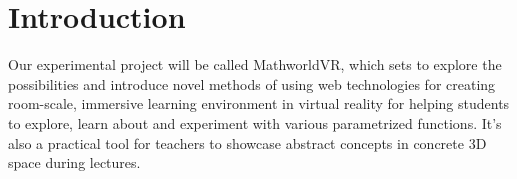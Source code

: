 \setcounter{page}{1}
\setcounter{equation}{0}
\setcounter{figure}{0}
\setcounter{table}{0}

\section*{Introduction}
Our experimental project will be called MathworldVR, which sets to explore the possibilities and introduce novel methods of using web technologies for creating room-scale, immersive learning environment in virtual reality for helping students to explore, learn about and experiment with various parametrized functions. It’s also a practical tool for teachers to showcase abstract concepts in concrete 3D space during lectures.